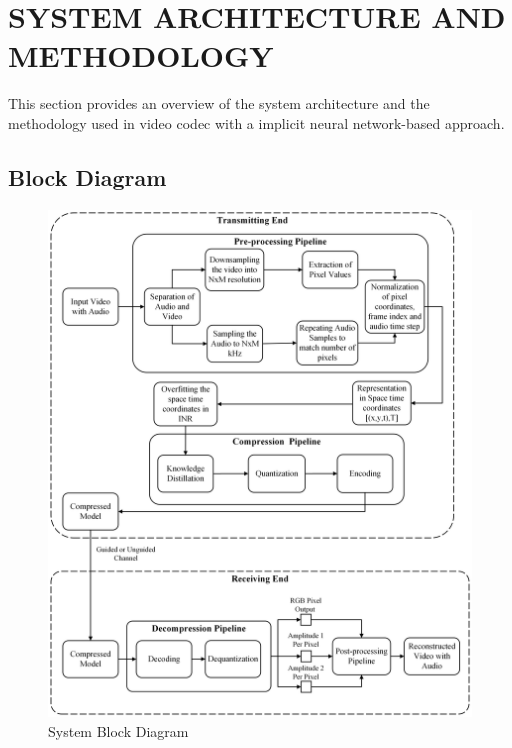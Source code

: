 \section{\MakeUppercase{System Architecture and Methodology}}
This section provides an overview of the system architecture and the methodology used in video \gls{codec} with a implicit neural network-based approach.
    \subsection{Block Diagram}
        \begin{figure}[H]
            \centering
            \includegraphics[width=\linewidth]{assets/Major Block Diagram.png}
            \caption{System Block Diagram}
            \label{fig:Block-Diagram}
        \end{figure}
        
